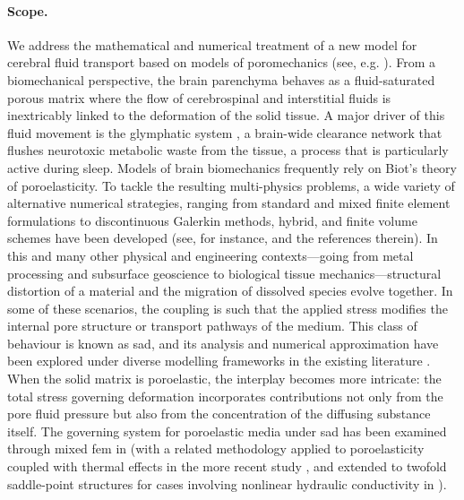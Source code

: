 \documentclass[fleqn,a4paper]{cas-sc}
\newcommand{\0}{\boldsymbol{0}}
\numberwithin{equation}{section}
\numberwithin{figure}{section}
\begin{document}
\paragraph{Scope.} {We address the mathematical and numerical treatment of a new model for cerebral fluid transport based on models of poromechanics (see, e.g. \cite{botti2021hybrid,tully2011cerebral,guo2019validation}). From a biomechanical perspective, the brain parenchyma  behaves as a fluid-saturated porous matrix where the flow of cerebrospinal and interstitial fluids is inextricably linked to the deformation of the solid tissue. A major driver of this fluid movement is the glymphatic system \cite{Xie2013-me}, a brain-wide clearance network that flushes neurotoxic metabolic waste from the tissue, a process that is particularly active during sleep. Models of brain biomechanics frequently rely on Biot's theory of poroelasticity. To tackle the resulting multi-physics problems, a wide variety of alternative numerical strategies, ranging from standard and mixed finite element formulations to discontinuous Galerkin methods, hybrid, and finite volume schemes have been developed (see, for instance, \cite{cadq2023,teichtmeister2019aspects,elyes18,li20,lee16,riviere2017error,asadi2014finite,eliseussen2023posteriori,fumagalli25} and the references therein).  
In this and many other} physical and engineering contexts—going from metal processing and subsurface geoscience to biological tissue mechanics—structural distortion of a material and the migration of dissolved species evolve together. In {some of these}  scenarios, the coupling is such that the applied stress modifies the internal pore structure or transport pathways of the medium. This class of behaviour is known as \gls{sad}, and its analysis and numerical approximation have been explored under diverse modelling frameworks in the existing literature \cite{gatica18,gatica19,gatica22}. When the solid matrix is poroelastic, the interplay becomes more intricate: the total stress governing deformation incorporates contributions not only from the pore fluid pressure but also from the concentration of the diffusing substance itself. The governing system for poroelastic media under \gls{sad} has been examined through mixed \gls{fem} in \cite{gomez23} (with a related methodology applied to poroelasticity coupled with thermal effects in the more recent study \cite{careaga25}, and extended to twofold saddle-point structures for cases involving nonlinear hydraulic conductivity in \cite{khan25,lamichhane24}).
\end{document}

